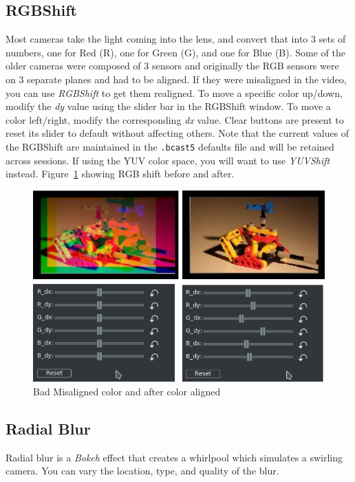 \subsection{RGBShift}%
\label{sub:rgb-shift}

Most cameras take the light coming into the lens, and convert that into $3$ sets of numbers, one for Red (R), one for Green (G), and one for Blue (B). Some of the older cameras were composed of $3$ sensors and originally the RGB sensors were on $3$ separate planes and had to be aligned. If they were misaligned in the video, you can use \textit{RGBShift} to get them realigned. To move a specific color up/down, modify the \textit{dy} value using the slider bar in the RGBShift window. To move a color left/right, modify the corresponding \textit{dx} value. Clear buttons are present to reset its slider to default without affecting others. Note that the current values of the RGBShift are maintained in the \texttt{.bcast5} defaults file and will be retained across sessions. If using the YUV color space, you will want to use \textit{YUVShift} instead. Figure~\ref{fig:rgbshift} showing RGB shift before and after.

\begin{figure}[hbtp]
    \centering
    \includegraphics[width=0.8\linewidth]{images/rgbshift.png}
    \caption{Bad Misaligned color and after color aligned}
    \label{fig:rgbshift}
\end{figure}

\subsection{Radial Blur}%
\label{sub:radial_blur}

Radial blur is a \textit{Bokeh} effect that creates a whirlpool which simulates a swirling camera. You can vary the location, type, and quality of the blur.

